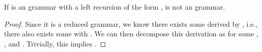 \begin{isabellebody}
\begin{isamarkuptext}
\begin{lemma}\label{G_LR0_lrec_imp_not_G'_LR0}
If  is an  grammar with a left recursion of the form 
,  is not an  grammar.
\begin{proof}
Since it is a reduced grammar, we know there exists some  derived by \isa{{\isasymalpha}}, i.e., there 
also exists some  with
.
We can then decompose this derivation as 
 for some , , and 
. Trivially, this implies .


\end{proof}
\end{lemma}
\end{isamarkuptext}
\end{isabellebody}

